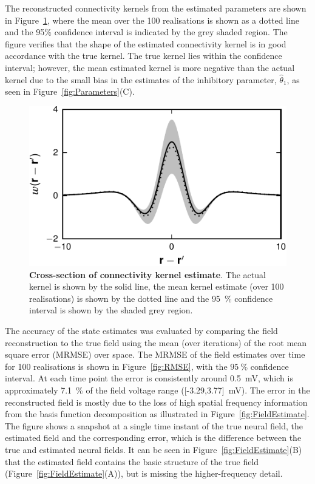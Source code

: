 \documentclass[10pt]{article}
\begin{document}
The reconstructed connectivity kernels from the estimated parameters are shown in Figure~\ref{fig:KernelEstimates}, where the mean over the 100 realisations is shown as a dotted line and the 95\% confidence interval is indicated by the grey shaded region. The figure verifies that the shape of the estimated connectivity kernel is in good accordance with the true kernel. The true kernel lies within the confidence interval; however, the mean estimated kernel is more negative than the actual kernel due to the small bias in the estimates of the inhibitory parameter, $\hat\theta_1$, as seen in Figure~\ref{fig:Parameters}(C).
\begin{figure}
    \centering
\includegraphics{./Graph/KernelEstimate.pdf}%
\caption{{\bf Cross-section of connectivity kernel estimate}. The actual kernel is shown by the solid line, the mean kernel estimate (over 100 realisations) is shown by the dotted line and the 95~\% confidence interval is shown by the shaded grey region.}
\label{fig:KernelEstimates}
\end{figure}
The accuracy of the state estimates was evaluated by comparing the field reconstruction to the true field using the mean (over iterations) of the root mean square error (MRMSE) over space. The MRMSE of the field estimates over time for 100 realisations is shown in Figure~\ref{fig:RMSE}, with the $95~\%$ confidence interval. At each time point the error is consistently around 0.5~mV, which is approximately 7.1~\% of the field voltage range ([-3.29,3.77]~mV). The error in the reconstructed field is mostly due to the loss of high spatial frequency information from the basis function decomposition as illustrated in Figure~\ref{fig:FieldEstimate}. The figure shows a snapshot at a single time instant of the true neural field, the estimated field and the corresponding error, which is the difference between the true and estimated neural fields. It can be seen in Figure~\ref{fig:FieldEstimate}(B) that the estimated field contains the basic structure of the true field (Figure~\ref{fig:FieldEstimate}(A)), but is missing the higher-frequency detail.
\end{document}

